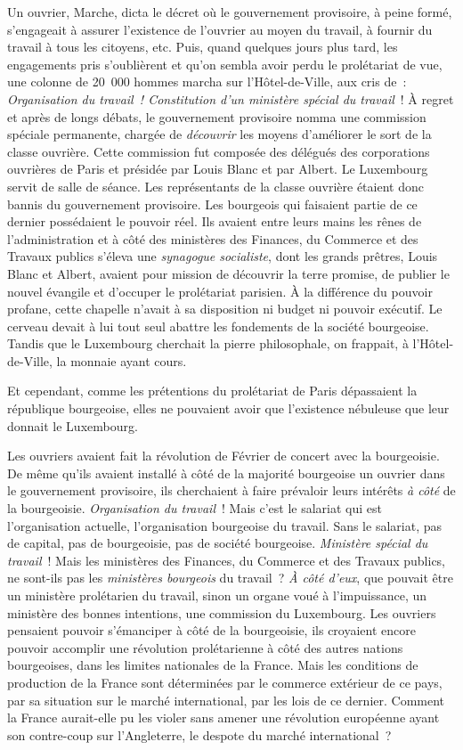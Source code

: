 \documentclass[twoside]{book} %
\begin{document}
Un ouvrier, Marche, dicta le décret où le gouvernement provisoire, à peine formé, s’engageait à assurer l’existence de l’ouvrier au moyen du travail, à fournir du travail à tous les citoyens, etc. Puis, quand quelques jours plus tard, les engagements pris s’oublièrent et qu’on sembla avoir perdu le prolétariat de vue, une colonne de 20 000 hommes marcha sur l’Hôtel-de-Ville, aux cris de : \emph{Organisation du travail ! Constitution d’un ministère spécial du travail} ! À regret et après de longs débats, le gouvernement provisoire nomma une commission spéciale permanente, chargée de \emph{découvrir} les moyens d’améliorer le sort de la classe ouvrière. Cette commission fut composée des délégués des corporations ouvrières de Paris et présidée par Louis Blanc et par Albert. Le Luxembourg servit de salle de séance. Les représentants de la classe ouvrière étaient donc bannis du gouvernement provisoire. Les bourgeois qui faisaient partie de ce dernier possédaient le pouvoir réel. Ils avaient entre leurs mains les rênes de l’administration et à côté des ministères des Finances, du Commerce et des Travaux publics s’éleva une \emph{synagogue socialiste}, dont les grands prêtres, Louis Blanc et Albert, avaient pour mission de découvrir la terre promise, de publier le nouvel évangile et d’occuper le prolétariat parisien. À la différence du pouvoir profane, cette chapelle n’avait à sa disposition ni budget ni pouvoir exécutif. Le cerveau devait à lui tout seul abattre les fondements de la société bourgeoise. Tandis que le Luxembourg cherchait la pierre philosophale, on frappait, à l’Hôtel-de-Ville, la monnaie ayant cours.\par
Et cependant, comme les prétentions du prolétariat de Paris dépassaient la république bourgeoise, elles ne pouvaient avoir que l’existence nébuleuse que leur donnait le Luxembourg.\par
Les ouvriers avaient fait la révolution de Février de concert avec la bourgeoisie. De même qu’ils avaient installé à côté de la majorité bourgeoise un ouvrier dans le gouvernement provisoire, ils cherchaient à faire prévaloir leurs intérêts \emph{à côté} de la bourgeoisie. \emph{Organisation du travail} ! Mais c’est le salariat qui est l’organisation actuelle, l’organisation bourgeoise du travail. Sans le salariat, pas de capital, pas de bourgeoisie, pas de société bourgeoise. \emph{Ministère spécial du travail} ! Mais les ministères des Finances, du Commerce et des Travaux publics, ne sont-ils pas les \emph{ministères bourgeois} du travail ? \emph{À côté d’eux}, que pouvait être un ministère prolétarien du travail, sinon un organe voué à l’impuissance, un ministère des bonnes intentions, une commission du Luxembourg. Les ouvriers pensaient pouvoir s’émanciper à côté de la bourgeoisie, ils croyaient encore pouvoir accomplir une révolution prolétarienne à côté des autres nations bourgeoises, dans les limites nationales de la France. Mais les conditions de production de la France sont déterminées par le commerce extérieur de ce pays, par sa situation sur le marché international, par les lois de ce dernier. Comment la France aurait-elle pu les violer sans amener une révolution européenne ayant son contre-coup sur l’Angleterre, le despote du marché international ?\par
\end{document}
